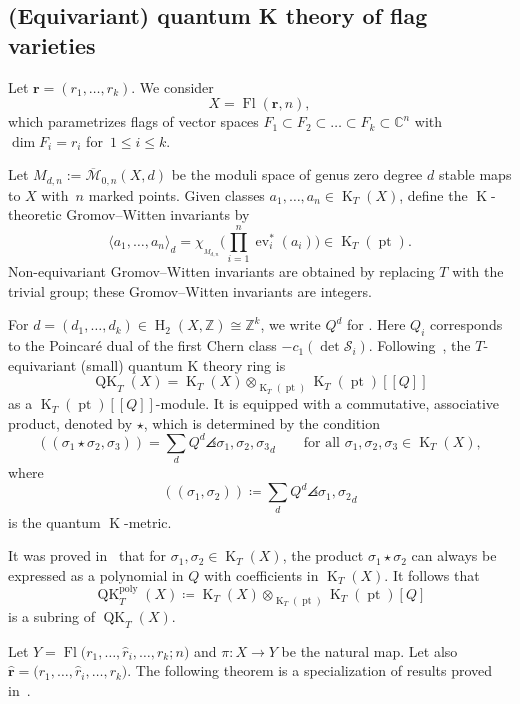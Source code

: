 \documentclass[pdftex]{sigma}
\numberwithin{equation}{section}
\theoremstyle{definition}
\DeclareMathOperator{\Fl}{Fl}
\DeclareMathOperator{\QK}{QK}
\DeclareMathOperator{\K}{K}
\DeclareMathOperator{\HH}{H}
\DeclareMathOperator{\pt}{pt}
\def\poly{{\mathrm{poly}}}
\DeclarePairedDelimiter{\angles}{\langle}{\rangle}
\newcommand{\bfr}{{\mathbf r}}
\newcommand{\C}{{\mathbb C}}
\newcommand{\Z}{{\mathbb Z}}
\newcommand{\cS}{{\mathcal S}}
\newcommand{\gw}[2]{\angles{ #1 }^{\mbox{}}_{#2}}
\newcommand{\euler}[1]{\chi_{_{#1}}}
\DeclareMathOperator{\ev}{ev}
\newcommand{\wb}{\overline}
\newcommand{\Mb}{\wb{\mathcal M}}
\begin{document}
\subsection{(Equivariant) quantum K theory of flag varieties}\label{sec:prelim}
Let $\mathbf{r}= (r_1, \dots, r_k)$. We consider \[X=\Fl(\bfr,n),\] which parametrizes flags of vector spaces
$F_{1} \subset F_{2} \subset \dots \subset F_{k} \subset \C^n$
with $\dim F_{i} = r_i$ for~${1 \le i \le k}$.

Let $M_{d,n} := \Mb_{0,n}(X,d)$ be the moduli space of genus zero degree
$d$ stable maps to $X$ with~$n$ marked points. Given classes
$a_1, \dots, a_n \in \K_T(X)$,
define the $\K$-theoretic Gromov--Witten invariants by
\[ \langle a_1, \dots, a_n \rangle_{d} =
\euler{M_{d,n}}\Biggl(\prod_{i = 1}^n\ev_i^*(a_i)\Biggr)\in \K_T(\pt) . \]
Non-equivariant Gromov--Witten invariants are obtained by replacing $T$ with the
trivial group; these Gromov--Witten invariants are integers.

For $d=(d_1,\dots,d_k)\in\HH_2(X,\Z)\cong\Z^k$, we write $Q^d$ for . Here $Q_i$ corresponds to the Poincar{\'e} dual of the first Chern class $-c_1(\det \cS_i)$. Following~\cite{givental:onwdvv,lee:QK}, the $T$-equivariant (small) quantum
K theory ring is
\begin{equation*}%
\QK_T(X) = \K_T(X) \otimes_{\K_T(\pt)} \K_T(\pt)[\![Q]\!]
\end{equation*}
as a $\K_T(\pt)[\![Q]\!]$-module.
It is equipped with a commutative, associative
product, denoted by $\star$, which is
determined by the condition
\begin{equation*}%
 (\!(\sigma_1\star\sigma_2,\sigma_3)\!)=\sum_d
 Q^d \gw{\sigma_1,\sigma_2,\sigma_3}{d}\qquad\text{for all $\sigma_1,\sigma_2,\sigma_3\in \K_T(X)$},
\end{equation*}
where
\[
 (\!(\sigma_1,\sigma_2)\!)\coloneqq \sum_{d}Q^d \gw{\sigma_1,\sigma_2}{d}
\]
is the quantum $\K$-metric.

It was proved in~\cite{anderson2022finite, kato:loop} that for $\sigma_1,\sigma_2\in\K_T(X)$, the product $\sigma_1\star\sigma_2$ can always be expressed as a polynomial in $Q$ with coefficients in $\K_T(X)$. It follows that
\[
 \QK_T^\poly(X)\coloneqq\K_T(X) \otimes_{\K_T(\pt)}\K_T(\pt)[Q]
\]
is a subring of $\QK_T(X)$.

Let $Y=\Fl\bigl(r_1,\dots, \widehat{r}_i,\dots, r_k;n\bigr)$ and $\pi\colon X\to Y$ be the natural map. Let also $\widehat{\mathbf{r}} = \bigl(r_1, \dots,\allowbreak \widehat{r}_i,\dots, r_k\bigr)$. The following theorem is a specialization of results proved in~\cite{kato2019quantum}.
\end{document}

